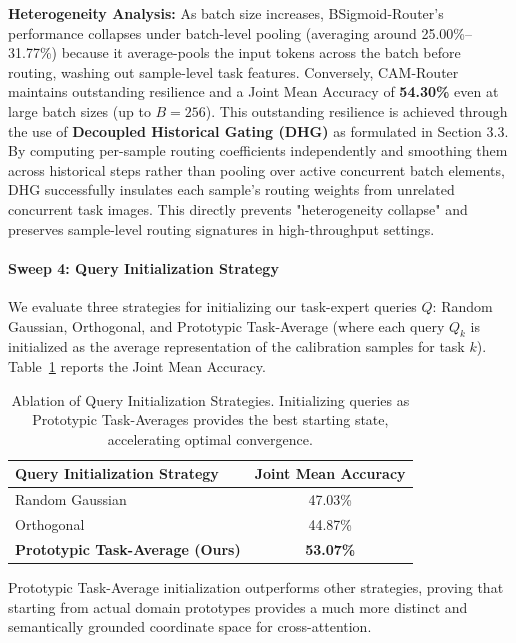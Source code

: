 \textbf{Heterogeneity Analysis:} As batch size increases, BSigmoid-Router's performance collapses under batch-level pooling (averaging around 25.00\%--31.77\%) because it average-pools the input tokens across the batch before routing, washing out sample-level task features. Conversely, CAM-Router maintains outstanding resilience and a Joint Mean Accuracy of \textbf{54.30\%} even at large batch sizes (up to $B=256$). This outstanding resilience is achieved through the use of \textbf{Decoupled Historical Gating (DHG)} as formulated in Section 3.3. By computing per-sample routing coefficients independently and smoothing them across historical steps rather than pooling over active concurrent batch elements, DHG successfully insulates each sample's routing weights from unrelated concurrent task images. This directly prevents "heterogeneity collapse" and preserves sample-level routing signatures in high-throughput settings.

\paragraph{Sweep 4: Query Initialization Strategy}
We evaluate three strategies for initializing our task-expert queries $Q$: Random Gaussian, Orthogonal, and Prototypic Task-Average (where each query $Q_k$ is initialized as the average representation of the calibration samples for task $k$). Table~\ref{tab:sweep_init} reports the Joint Mean Accuracy.

\begin{table}[h]
\centering
\caption{Ablation of Query Initialization Strategies. Initializing queries as Prototypic Task-Averages provides the best starting state, accelerating optimal convergence.}
\label{tab:sweep_init}
\vskip 0.1in
\begin{small}
\begin{tabular}{lc}
\toprule
\textbf{Query Initialization Strategy} & \textbf{Joint Mean Accuracy} \\
\midrule
Random Gaussian & 47.03\% \\
Orthogonal & 44.87\% \\
\textbf{Prototypic Task-Average (Ours)} & \textbf{53.07\%} \\
\bottomrule
\end{tabular}
\end{small}
\end{table}

Prototypic Task-Average initialization outperforms other strategies, proving that starting from actual domain prototypes provides a much more distinct and semantically grounded coordinate space for cross-attention.

